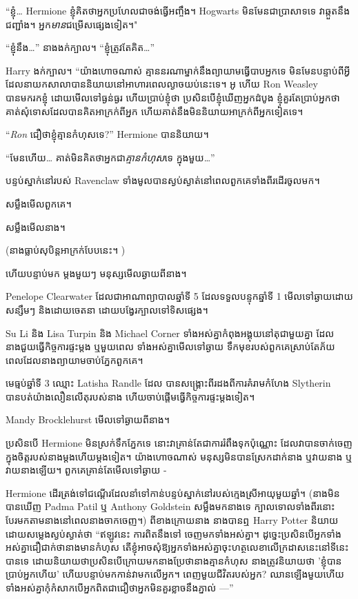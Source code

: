 {{“ខ្ញុំ… Hermione ខ្ញុំគិតថាអ្នកប្រហែលជាចង់ធ្វើអញ្ចឹង។ Hogwarts មិនមែនជាប្រាសាទទេ វាឆ្កួតនឹងជញ្ជាំង។ អ្នក\emph{មាន}ជម្រើសផ្សេងទៀត។"

“ខ្ញុំនឹង…” នាងងក់ក្បាល។ “ខ្ញុំត្រូវតែគិត…”

Harry ងក់ក្បាល។ “យ៉ាងហោចណាស់ គ្មាននរណាម្នាក់នឹងព្យាយាមធ្វើបាបអ្នកទេ មិនមែនបន្ទាប់ពីអ្វីដែលនាយកសាលាបាននិយាយនៅអាហារពេលល្ងាចយប់នេះទេ។ អូ ហើយ Ron Weasley បានមករកខ្ញុំ ដោយមើលទៅធ្ងន់ធ្ងរ ហើយប្រាប់ខ្ញុំថា ប្រសិនបើខ្ញុំឃើញអ្នកដំបូង ខ្ញុំគួរតែប្រាប់អ្នកថា គាត់សុំទោសដែលបានគិតអាក្រក់ពីអ្នក ហើយគាត់នឹងមិននិយាយអាក្រក់ពីអ្នកទៀតទេ។

“\emph{Ron} ជឿថាខ្ញុំគ្មានកំហុសទេ?” Hermione បាននិយាយ។

“មែនហើយ… គាត់មិនគិតថាអ្នកជា\emph{គ្មានកំហុស}ទេ ក្នុងមួយ…”

\later

បន្ទប់ស្នាក់នៅរបស់ Ravenclaw ទាំងមូលបានស្ងប់ស្ងាត់នៅពេលពួកគេទាំងពីរដើរចូលមក។

សម្លឹងមើលពួកគេ។

សម្លឹងមើលនាង។

(នាងធ្លាប់សុបិន្តអាក្រក់បែបនេះ។ )

ហើយបន្ទាប់មក ម្តងមួយៗ មនុស្សមើលឆ្ងាយពីនាង។

Penelope Clearwater ដែលជាអាណាព្យាបាលឆ្នាំទី 5 ដែលទទួលបន្ទុកឆ្នាំទី 1 មើលទៅឆ្ងាយដោយសន្សឹមៗ និងដោយចេតនា ដោយបង្វែរក្បាលទៅទិសផ្សេង។

Su Li និង Lisa Turpin និង Michael Corner ទាំងអស់គ្នាកំពុងអង្គុយនៅតុជាមួយគ្នា ដែលនាងជួយធ្វើកិច្ចការផ្ទះម្តង ឬមួយពេល ទាំងអស់គ្នាមើលទៅឆ្ងាយ ទឹកមុខរបស់ពួកគេស្រាប់តែភ័យ ពេលដែលនាងព្យាយាមចាប់ភ្នែកពួកគេ។

មេធ្មប់ឆ្នាំទី 3 ឈ្មោះ Latisha Randle ដែល \SPHEW បានសង្គ្រោះពីរដងពីការគំរាមកំហែង Slytherin បានបត់យ៉ាងលឿនលើតុរបស់នាង ហើយចាប់ផ្តើមធ្វើកិច្ចការផ្ទះម្តងទៀត។

Mandy Brocklehurst មើលទៅឆ្ងាយពីនាង។

ប្រសិនបើ Hermione មិនស្រក់ទឹកភ្នែកទេ នោះវាគ្រាន់តែជាការរំពឹងទុកប៉ុណ្ណោះ ដែលវាបានចាក់ចេញក្នុងចិត្តរបស់នាងម្តងហើយម្តងទៀត។ យ៉ាង​ហោច​ណាស់ មនុស្ស​មិន​បាន​ស្រែក​ដាក់​នាង ឬ​វាយ​នាង ឬ​វាយ​នាង​ឡើយ។ ពួកគេគ្រាន់តែមើលទៅឆ្ងាយ -

Hermione ដើរ​ត្រង់​ទៅ​ជណ្តើរ​ដែល​នាំ​ទៅ​កាន់​បន្ទប់​ស្នាក់​នៅ​របស់​ក្មេង​ស្រី​អាយុ​មួយ​ឆ្នាំ។ (នាងមិនបានឃើញ Padma Patil ឬ Anthony Goldstein សម្លឹងមកនាងទេ ក្បាលទោលទាំងពីរនោះបែរមកតាមនាងនៅពេលនាងចាកចេញ។) ពីខាងក្រោយនាង នាងបានឮ Harry Potter និយាយដោយសម្លេងស្ងប់ស្ងាត់ថា “ឥឡូវនេះ ការពិតនឹងទៅ ចេញមកទាំងអស់គ្នា។ ដូច្នេះប្រសិនបើអ្នកទាំងអស់គ្នាជឿជាក់ថានាងមានកំហុស តើខ្ញុំអាចសុំឱ្យអ្នកទាំងអស់គ្នាចុះហត្ថលេខាលើក្រដាសនេះនៅទីនេះបានទេ ដោយនិយាយថាប្រសិនបើក្រោយមកនាងប្រែថានាងគ្មានកំហុស នាងត្រូវនិយាយថា 'ខ្ញុំបានប្រាប់អ្នកហើយ' ហើយបន្ទាប់មកកាន់វាមកលើអ្នក។ ពេញមួយជីវិតរបស់អ្នក? ឈាន​ឡើង​មួយ​ហើយ​ទាំង​អស់​គ្នា​កុំ​កំសាក​ បើ​អ្នក​ពិត​ជា​ជឿ​ថា​អ្នក​មិន​គួរ​ខ្លាច​នឹង​ភ្នាល់ —”

}}
